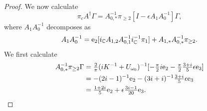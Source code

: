 \begin{proof}
	We now calculate 
\begin{equation}\label{e:picAdagGamma}
	\pi_c A^{\dagger} \Gamma  = A_{0,*}^{-1}  \pi_{\geq 2} [ I - \epsilon A_1 A_0^{-1} ]\Gamma ,
\end{equation}
where
$A_1 A_0^{-1}$ decomposes as
\begin{equation}\label{e:A1A0decomposition}
  A_1 A_0^{-1} = 
  \mathrm{e}_2 [i_{\mathbb{C}} A_{1,2}A_{0,1}^{-1} i_{\mathbb{C}}^{-1} \pi_1] 
  +A_{1,*} A_{0,*}^{-1}  \pi_{\geq 2} . 
\end{equation}
We first calculate  
\begin{alignat}{1}
	A_{0,*}^{-1} \pi_{\geq 2} \Gamma &= \tfrac{2}{ \pi } ( i K^{-1} + U_{\omega_0} )^{-1}  [ - \tfrac{\pi}{2} i \mathrm{e}_2 - \tfrac{\pi}{2} \tfrac{3+i}{5}\epsilon \mathrm{e}_3 ] \nonumber\\
	&= -(2i-1)^{-1} \mathrm{e}_2 - (3i+i)^{-1} \tfrac{3+i}{5} \epsilon \mathrm{e}_3 \nonumber\\
	&= \tfrac{1+2i}{5} \mathrm{e}_2 + \epsilon \tfrac{ 3 i-1}{20} \mathrm{e}_3  \label{e:A0piGamma}. 
\end{alignat}


\end{proof}
